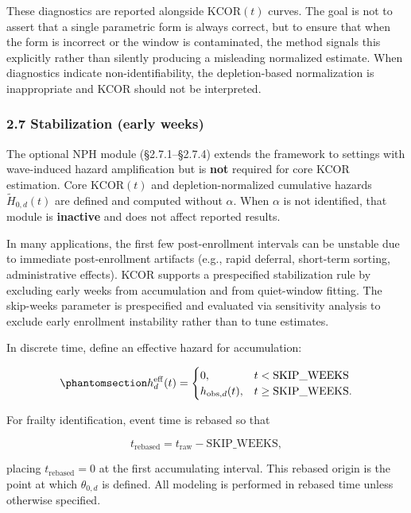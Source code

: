 \documentclass[
]{article}
\begin{document}
These diagnostics are reported alongside \(\mathrm{KCOR}(t)\) curves.
The goal is not to assert that a single parametric form is always
correct, but to ensure that when the form is incorrect or the window is
contaminated, the method signals this explicitly rather than silently
producing a misleading normalized estimate. When diagnostics indicate
non-identifiability, the depletion-based normalization is inappropriate
and KCOR should not be interpreted.

\subsubsection{2.7 Stabilization (early
weeks)}\label{stabilization-early-weeks}

The optional NPH module (§2.7.1--§2.7.4) extends the framework to
settings with wave-induced hazard amplification but is \textbf{not}
required for core KCOR estimation. Core \(\mathrm{KCOR}(t)\) and
depletion-normalized cumulative hazards \(\tilde H_{0,d}(t)\) are
defined and computed without \(\alpha\). When \(\alpha\) is not
identified, that module is \textbf{inactive} and does not affect
reported results.

In many applications, the first few post-enrollment intervals can be
unstable due to immediate post-enrollment artifacts (e.g., rapid
deferral, short-term sorting, administrative effects). KCOR supports a
prespecified stabilization rule by excluding early weeks from
accumulation and from quiet-window fitting. The skip-weeks parameter is
prespecified and evaluated via sensitivity analysis to exclude early
enrollment instability rather than to tune estimates.

In discrete time, define an effective hazard for accumulation:

\begin{equation}\protect\phantomsection\label{eq:effective-hazard-skip}{
h_d^{\mathrm{eff}}(t)=
\begin{cases}
0, & t < \mathrm{SKIP\_WEEKS} \\
h_{\mathrm{obs},d}(t), & t \ge \mathrm{SKIP\_WEEKS}.
\end{cases}
}\end{equation}

For frailty identification, event time is rebased so that

\[
t_{\mathrm{rebased}} = t_{\mathrm{raw}} - \mathrm{SKIP\_WEEKS},
\]

placing \(t_{\mathrm{rebased}}=0\) at the first accumulating interval.
This rebased origin is the point at which \(\theta_{0,d}\) is defined.
All modeling is performed in rebased time unless otherwise specified.
\end{document}

